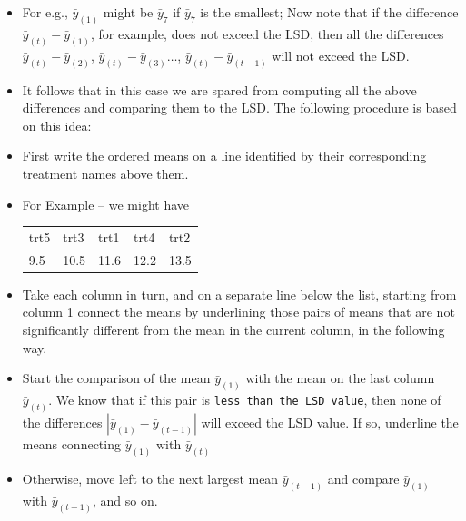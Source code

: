 \documentclass[xcolor=dvipsnames,12pt]{beamer}
\begin{document}
\begin{frame}
\begin{itemize}
\item For e.g., $\bar{y}_{(1)}$ might be $\bar{y}_7$ if $\bar{y}_{7}$ is
the smallest;  Now note that if the  difference  $\bar{y}_{(t)}- \bar{y}_{(1)}$,
for example, does not exceed the LSD, then all the  differences
$\bar{y}_{(t)}- \bar{y}_{(2)}$,  $\bar{y}_{(t)}- \bar{y}_{(3)}\ldots$,
$\bar{y}_{(t)}- \bar{y}_{(t-1)}$ will not exceed the LSD.
\item It follows that in this case we are spared from computing all the 
above differences and comparing them to the LSD. The following 
procedure is based on this idea:
\item First write the
ordered  means on a line identified by their corresponding treatment names
above them.
\item For Example -- we might have\\[.1in]
\hspace*{1in}\begin{tabular}{lllll}
       trt5 & trt3 & trt1 & trt4 & trt2 \\[.1in]
  9.5 & 10.5 & 11.6 & 12.2 & 13.5\\
       \end{tabular}
       
\end{itemize}
\end{frame}


  
\begin{frame}
\begin{itemize}
\item Take each column in turn, and on a
separate line below the list, starting from column 1 connect the
means by underlining those pairs of means that are not significantly 
different from the mean in the current column, in the following way.
\item Start the comparison of the mean $\bar{y}_{(1)}$
with the mean on the last column $\bar{y}_{(t)}$. We know that if this pair is 
{\tt less than the LSD value}, then none of the differences $|\bar{y}_{(1)}-\bar{y}_{(t-1)}|$
will exceed the LSD value. If so, underline the means connecting $\bar{y}_{(1)}$ with $\bar{y}_{(t)}$
\item Otherwise, move left to the next largest mean $\bar{y}_{(t-1)}$ and compare
 $\bar{y}_{(1)}$ with $\bar{y}_{(t-1)}$, and so on.
\end{itemize}
\end{frame}
\end{document}
